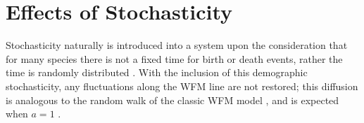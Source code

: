 \documentclass[a4paper,10pt]{article}
\numberwithin{equation}{section} %
\begin{document}
\section{Effects of Stochasticity}
Stochasticity naturally is introduced into a system upon the consideration that for many species there is not a fixed time for birth or death events, rather the time is randomly distributed \cite{VanKampen1992,Elgart2004a,Parker2009,Assaf2006}. %
With the inclusion of this demographic stochasticity, any fluctuations along the WFM line are not restored;%
this diffusion is analogous to the random walk of the %
 classic WFM model \cite{Dobrinevski2012}, and is expected when $a=1$ \cite{Lin2012,Constable2015,Chotibut2015}. %
%
\end{document}
